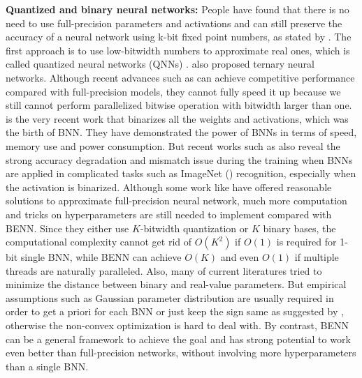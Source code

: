 \documentclass[10pt,twocolumn,letterpaper]{article}
\begin{document}
\textbf{Quantized and binary neural networks: } People have found that there is no need to use full-precision parameters and activations and can still preserve the accuracy of a neural network using k-bit fixed point numbers, as stated by \cite{gong2014compressing, han2015deep, wu2016quantized, cai2017deep, li2017training, lin2016fixed, park2017weighted, sung2015resiliency, polino2018model}. The first approach is to use low-bitwidth numbers to approximate real ones, which is called quantized neural networks (QNNs) \cite{hubara2016quantized}. \cite{zhu2016trained, zhou2017incremental} also proposed ternary neural networks. Although recent advances such as \cite{zhou2016dorefa} can achieve competitive performance compared with full-precision models, they cannot fully speed it up because we still cannot perform parallelized bitwise operation with bitwidth larger than one. \cite{hubara2016binarized} is the very recent work that binarizes all the weights and activations, which was the birth of BNN. They have demonstrated the power of BNNs in terms of speed, memory use and power consumption. But recent works such as \cite{tang2017train, courbariaux2016binarized, guo2017network, courbariaux2015binaryconnect} also reveal the strong accuracy degradation and mismatch issue during the training when BNNs are applied in complicated tasks such as ImageNet (\cite{deng2009imagenet}) recognition, especially when the activation is binarized. Although some work like \cite{lin2017towards, rastegari2016xnor, deng2017gated} have offered reasonable solutions to approximate full-precision neural network, much more computation and tricks on hyperparameters are still needed to implement compared with BENN. Since they either use $K$-bitwidth quantization or $K$ binary bases, the computational complexity cannot get rid of $O(K^{2})$ if $O(1)$ is required for 1-bit single BNN, while BENN can achieve $O(K)$ and even $O(1)$ if multiple threads are naturally paralleled. Also, many of current literatures tried to minimize the distance between binary and real-value parameters. But empirical assumptions such as Gaussian parameter distribution are usually required in order to get a priori for each BNN or just keep the sign same as suggested by \cite{lin2017towards}, otherwise the non-convex optimization is hard to deal with. By contrast, BENN can be a general framework to achieve the goal and has strong potential to work even better than full-precision networks, without involving more hyperparameters than a single BNN.
\end{document}
